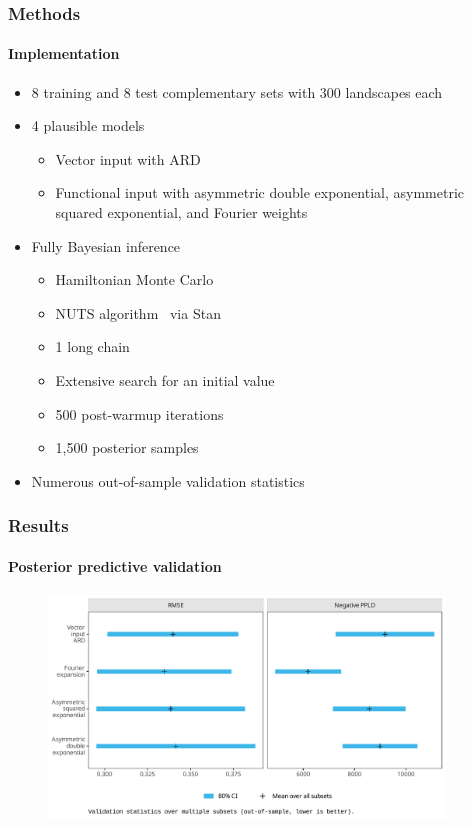 \documentclass{snedecorbeamer}
\begin{document}
\begin{frame}
  \frametitle{Methods}
  \framesubtitle{Implementation}

  \begin{itemize}
  \item 8 training and 8 test complementary sets with 300 landscapes each
  \item 4 plausible models
    \begin{itemize}
    \item Vector input with ARD
    \item Functional input with asymmetric double exponential, asymmetric
      squared exponential, and Fourier weights
    \end{itemize}
  \item Fully Bayesian inference
    \begin{itemize}
    \item Hamiltonian Monte Carlo~\cite[ch. 5]{brooks2011}
    \item NUTS algorithm~\cite{hoffman2014} via
      Stan~\cite{standevelopmentteam2021}
    \item 1 long chain~\cite{raftery1992}
    \item Extensive search for an initial value
    \item 500 post-warmup iterations
    \item 1,500 posterior samples
    \end{itemize}
  \item \hyperlink{frm:validation}{}
    Numerous out-of-sample validation statistics
  \end{itemize}
\end{frame}

\begin{frame}
  \frametitle{Results}
  \framesubtitle{Posterior predictive validation}

  \begin{figure}
    \centering
    \includegraphics[height=16em]{inc/wepp_validation_summary_mini.pdf}
  \end{figure}

\end{frame}
\end{document}
